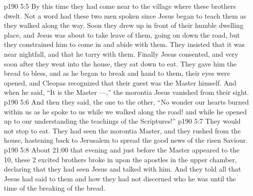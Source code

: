 \vs p190 5:5 By this time they had come near to the village where these brothers dwelt. Not a word had these two men spoken since Jesus began to teach them as they walked along the way. Soon they drew up in front of their humble dwelling place, and Jesus was about to take leave of them, going on down the road, but they constrained him to come in and abide with them. They insisted that it was near nightfall, and that he tarry with them. Finally Jesus consented, and very soon after they went into the house, they sat down to eat. They gave him the bread to bless, and as he began to break and hand to them, their eyes were opened, and Cleopas recognized that their guest was the Master himself. And when he said, “It is the Master ---,” the morontia Jesus vanished from their sight.
\vs p190 5:6 And then they said, the one to the other, “No wonder our hearts burned within us as he spoke to us while we walked along the road! and while he opened up to our understanding the teachings of the Scriptures!”
\vs p190 5:7 They would not stop to eat. They had seen the morontia Master, and they rushed from the house, hastening back to Jerusalem to spread the good news of the risen Saviour.
\vs p190 5:8 About 21:00 that evening and just before the Master appeared to the 10, these 2 excited brothers broke in upon the apostles in the upper chamber, declaring that they had seen Jesus and talked with him. And they told all that Jesus had said to them and how they had not discerned who he was until the time of the breaking of the bread.
\quizlink
